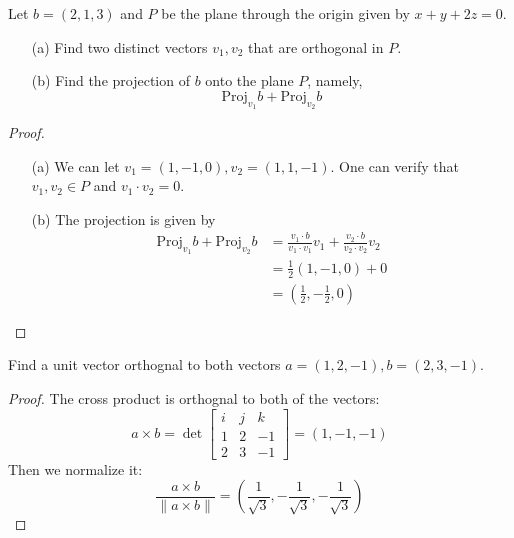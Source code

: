 \documentclass[openany]{book}
\begin{document}
\begin{prob}
    Let $b=(2,1,3)$ and $P$ be the plane through the origin given by $x+y+2z=0$. 
    \begin{enumerate}
        \item[(a)] Find two distinct vectors $v_1,v_2$ that are orthogonal in $P$.
        \item[(b)] Find the projection of $b$ onto the plane $P$, namely, 
        \begin{equation*}
            \text{Proj}_{v_1}b+\text{Proj}_{v_2}b
        \end{equation*}
    \end{enumerate}
\end{prob}
\begin{proof}
    \begin{enumerate}
        \item[(a)] We can let $v_1=(1,-1,0), v_2=(1,1,-1)$. One can verify that $v_1,v_2\in P$ and $v_1\cdot v_2=0$.
        \item[(b)] The projection is given by
        \begin{align*}
            \text{Proj}_{v_1}b+\text{Proj}_{v_2}b&=\frac{v_1\cdot b}{v_1\cdot v_1}v_1+\frac{v_2\cdot b}{v_2\cdot v_2}v_2\\
            &=\frac{1}{2}(1,-1,0)+0\\
            &=\left(\frac{1}{2}, -\frac{1}{2}, 0\right)
        \end{align*}
    \end{enumerate}
\end{proof}


\begin{prob}
    Find a unit vector orthognal to both vectors $a=(1,2,-1), b=(2,3,-1)$.
\end{prob}
\begin{proof}
    The cross product is orthognal to both of the vectors:
    \begin{equation*}
        a\times b=\det\begin{bmatrix}
            i&j&k\\
            1&2&-1\\
            2&3&-1
        \end{bmatrix}=(1,-1, -1)
    \end{equation*}
    Then we normalize it:
    \begin{equation*}
        \frac{a\times b}{\|a\times b\|}=\left(\frac{1}{\sqrt{3}}, -\frac{1}{\sqrt{3}}, -\frac{1}{\sqrt{3}}\right)
    \end{equation*}
\end{proof}
\end{document}
